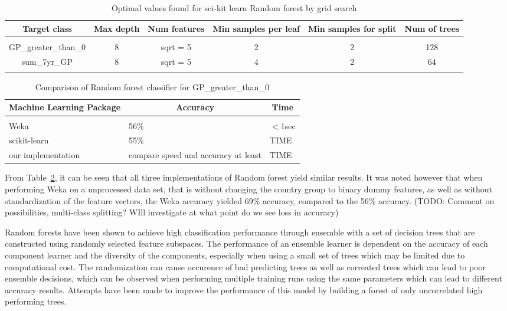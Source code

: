 \documentclass{article} %
\begin{document}
\begin{table}[t]
\caption{Optimal values found for sci-kit learn Random forest by grid search}
\begin{center}
\begin{tabular}{cccccc}
{\bf Target class} &{\bf Max depth} &{\bf Num features} &{\bf Min samples per leaf} &{\bf Min samples for split} &{\bf Num of trees}
\\ \hline \\
GP\_greater\_than\_0         &8	&sqrt = 5	&2	&2	&128 \\
sum\_7yr\_GP         &8	&sqrt = 5	&4	&2	&64 \\
\label{scikit-table}
\end{tabular}
\end{center}
\end{table}


\begin{table}[t]
\caption{Comparison of Random forest classifier for GP\_greater\_than\_0}
\label{clas-table}
\begin{center}
\begin{tabular}{lll}
\multicolumn{1}{c}{\bf Machine Learning Package} &\multicolumn{1}{c}{\bf Accuracy} &\multicolumn{1}{c}{\bf Time}
\\ \hline \\
Weka         &56\%	&$<$1sec \\
scikit-learn             &55\%	&TIME \\
our implementation             &compare speed and accuracy at least	&TIME \\

\end{tabular}
\end{center}
\end{table}

From Table~\ref{clas-table}, it can be seen that all three implementations of Random forest yield similar results. It was noted however that when performing Weka on a unprocessed data set, that is without changing the country group to binary dummy features, as well as without standardization of the feature vectors, the Weka accuracy yielded 69\% accuracy, compared to the 56\% accuracy. (TODO: Comment on possibilities, multi-class splitting? WIll investigate at what point do we see loss in accuracy)

Random forests have been shown to achieve high classification performance through ensemble with a set of decision trees that are constructed using randomly selected feature subspaces. The performance of an ensemble learner is dependent on the accuracy of each component learner and the diversity of the components, especially when using a small set of trees which may be limited due to computational cost. The randomization can cause occurence of bad predicting trees as well as correated trees which can lead to poor ensemble decisions, which can be observed when performing multiple training runs using the same parameters which can lead to different accuracy results. Attempts have been made to improve the performance of this model by building a forest of only uncorrelated high performing trees. \cite{Bharathidason2014}
\end{document}
